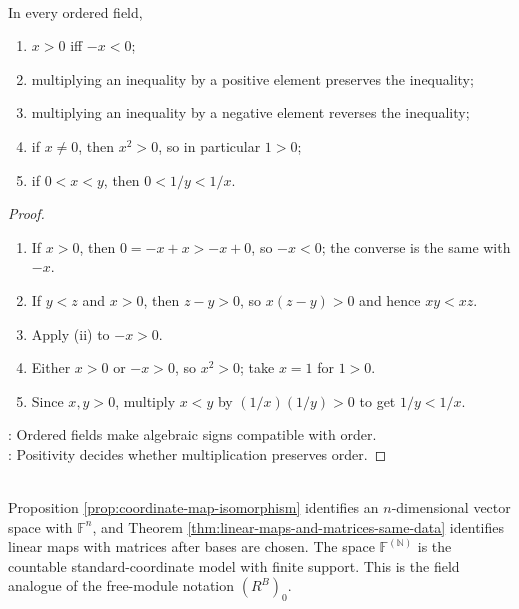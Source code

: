 \begin{proposition} \label{prop:ordered-field-inequality-rules-analysis} \\
In every ordered field,
\begin{enumerate}[label=(\roman*)]
\setlength{\itemsep}{0pt}
\item $x>0$ iff $-x<0$;
\item multiplying an inequality by a positive element preserves the inequality;
\item multiplying an inequality by a negative element reverses the inequality;
\item if $x\neq0$, then $x^2>0$, so in particular $1>0$;
\item if $0<x<y$, then $0<1/y<1/x$.
\end{enumerate}
\begin{proof}
\begin{enumerate}[label=(\roman*)]
\setlength{\itemsep}{0pt}
\item If $x>0$, then $0=-x+x>-x+0$, so $-x<0$; the converse is the same with $-x$.
\item If $y<z$ and $x>0$, then $z-y>0$, so $x(z-y)>0$ and hence $xy<xz$.
\item Apply (ii) to $-x>0$.
\item Either $x>0$ or $-x>0$, so $x^2>0$; take $x=1$ for $1>0$.
\item Since $x,y>0$, multiply $x<y$ by $(1/x)(1/y)>0$ to get $1/y<1/x$.
\end{enumerate}
: Ordered fields make algebraic signs compatible with order.\\
: Positivity decides whether multiplication preserves order.
\end{proof}
\end{proposition}

\begin{perspective} \label{per:finite-support-coordinate-model} \\
Proposition \ref{prop:coordinate-map-isomorphism} identifies an $n$-dimensional vector space with $\mathbb{F}^n$, and Theorem \ref{thm:linear-maps-and-matrices-same-data} identifies linear maps with matrices after bases are chosen. The space $\mathbb{F}^{(\mathbb{N})}$ is the countable standard-coordinate model with finite support. This is the field analogue of the free-module notation $(R^B)_0$.
\end{perspective}
